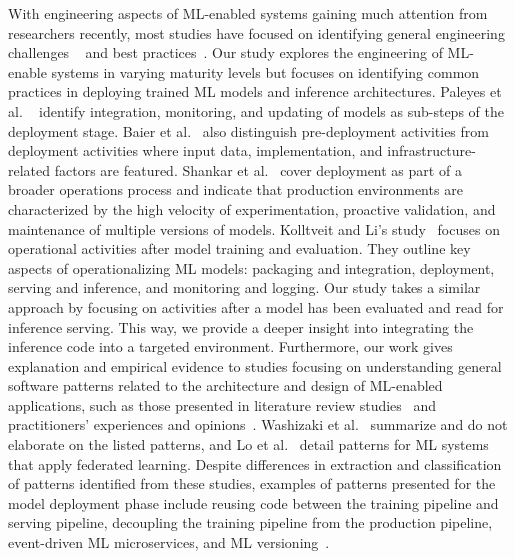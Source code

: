 With engineering aspects of ML-enabled systems gaining much attention from researchers recently, most studies have focused on identifying general engineering challenges ~\cite{lwakatare2019taxonomy, paleyes2022challenges, giray2021software, martinez2022software, baier2019challenges} and best practices~\cite{serban}. Our study explores the engineering of ML-enable systems in varying maturity levels but focuses on identifying common practices in deploying trained ML models %
and inference architectures. Paleyes et al. ~\cite{paleyes2022challenges} identify integration, monitoring, and updating of models as sub-steps of the deployment stage. Baier et al.~\cite{baier2019challenges} also distinguish pre-deployment activities from deployment activities where input data, implementation, and infrastructure-related factors are featured. Shankar et al.~\cite{shankar2022operationalizing} cover deployment as part of a broader operations process and indicate that production environments are characterized by the high velocity of experimentation, proactive validation, and maintenance of multiple versions of models. Kolltveit and Li's study~\cite{kolltveit2022operationalizing} focuses on operational activities after model training and evaluation. They outline key aspects of operationalizing ML models: packaging and integration, deployment, serving and inference, and monitoring and logging.  Our study takes a similar approach by focusing on activities after a model has been evaluated and read for inference serving. This way, we provide a deeper insight into integrating the inference code into a targeted environment.
Furthermore, our work gives explanation and empirical evidence to studies focusing on understanding general software patterns related to the architecture and design of ML-enabled applications, such as those presented in literature review studies~\cite{washizaki, Lo, heiland2023design} and practitioners' experiences and opinions~\cite{lakshmanan2020machine, take}. Washizaki et al.~\cite{washizaki} summarize and do not elaborate on the listed patterns, and Lo et al.~\cite{Lo} detail patterns for ML systems that apply federated learning. Despite differences in extraction and classification of patterns identified from these studies, examples of patterns presented for the model deployment phase include reusing code between the training pipeline and serving pipeline, decoupling the training pipeline from the production pipeline, event-driven ML microservices, and ML versioning~\cite{washizaki}. %

